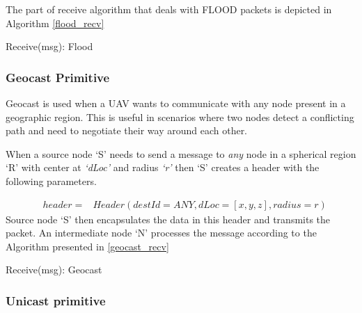 The part of receive algorithm that deals with FLOOD packets is depicted in Algorithm \ref{flood_recv}

\begin{algorithm}
\caption{Receive(msg): Flood} 
\label{flood_recv}
\DontPrintSemicolon
{}

\end{algorithm}

\subsubsection{Geocast Primitive}

Geocast is used when a UAV wants to communicate with any node present in a geographic region. This is useful in scenarios where two nodes detect a conflicting path and need to negotiate their way around each other.  

When a source node `S' needs to send a message to \emph{any} node in a spherical region `R' with center at \emph{`dLoc'} and radius \emph{`r'} then `S' creates a header with the following parameters.

\begin{eqnarray*}
& header = & Header(destId=ANY, dLoc=[x,y,z], radius=r)
\end{eqnarray*}
Source node `S' then encapsulates the data in this header and transmits the packet. An intermediate node `N' processes the message according to the Algorithm presented in \ref{geocast_recv}

\begin{algorithm}
\caption{Receive(msg): Geocast} 
\label{geocast_recv}
\DontPrintSemicolon
{}
\end{algorithm}

\subsubsection{Unicast primitive}

